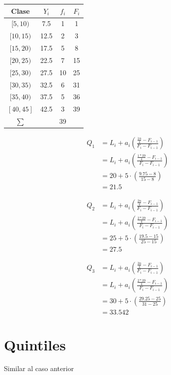 \documentclass[
  11pt,
]{krantz}
\theoremstyle{definition}
\theoremstyle{definition}
\theoremstyle{definition}
\theoremstyle{definition}
\theoremstyle{remark}
\begin{document}
\begin{longtable}[]{@{}cccc@{}}
\toprule
Clase & \(Y_i\) & \(f_i\) & \(F_i\) \\
\midrule
\endhead
\([5,10)\) & 7.5 & 1 & 1 \\
\([10,15)\) & 12.5 & 2 & 3 \\
\([15,20)\) & 17.5 & 5 & 8 \\
\([20,25)\) & 22.5 & 7 & 15 \\
\([25,30)\) & 27.5 & 10 & 25 \\
\([30,35)\) & 32.5 & 6 & 31 \\
\([35,40)\) & 37.5 & 5 & 36 \\
\([40,45]\) & 42.5 & 3 & 39 \\
\(\sum\) & & 39 & \\
\bottomrule
\end{longtable}

\[
\begin{aligned}
Q_1&=L_i+ a_i\left(\frac{\frac{1n}{4}-F_{i-1}}{F_i-F_{i-1}}\right)\\
&=L_i+ a_i\left(\frac{\frac{1*39}{4}-F_{i-1}}{F_i-F_{i-1}}\right)\\
&=20+ 5\cdot\left(\frac{9.75 -8}{15-8}\right)\\
&=21.5
\end{aligned}
\]

\[
\begin{aligned}
Q_2&=L_i+ a_i\left(\frac{\frac{2n}{4}-F_{i-1}}{F_i-F_{i-1}}\right)\\
&=L_i+ a_i\left(\frac{\frac{2*39}{4}-F_{i-1}}{F_i-F_{i-1}}\right)\\
&=25+ 5\cdot\left(\frac{19.5 -15}{25-15}\right)\\
&= 27.5
\end{aligned}
\]

\[
\begin{aligned}
Q_3&=L_i+ a_i\left(\frac{\frac{3n}{4}-F_{i-1}}{F_i-F_{i-1}}\right)\\
&=L_i+ a_i\left(\frac{\frac{2*39}{4}-F_{i-1}}{F_i-F_{i-1}}\right)\\
&=30+ 5\cdot\left(\frac{29.25 -25}{31-25}\right)\\
&= 33.542
\end{aligned}
\]

\hypertarget{quintiles}{%
\section{Quintiles}\label{quintiles}}

Similar al caso anterior
\end{document}
